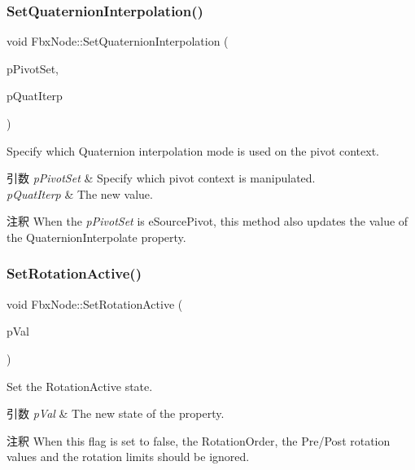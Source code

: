 \subsubsection{\texorpdfstring{Set\+Quaternion\+Interpolation()}{SetQuaternionInterpolation()}}
{\footnotesize\ttfamily void Fbx\+Node\+::\+Set\+Quaternion\+Interpolation (\begin{DoxyParamCaption}\item[{\hyperlink{class_fbx_node_ae62b7311ac4727654cdf1ebd5cbf7343}{E\+Pivot\+Set}}]{p\+Pivot\+Set,  }\item[{\hyperlink{fbxmath_8h_a9c7a0dfb52c83256d4a92c5c6d1be72a}{E\+Fbx\+Quat\+Interp\+Mode}}]{p\+Quat\+Iterp }\end{DoxyParamCaption})}

Specify which Quaternion interpolation mode is used on the pivot context. 
\begin{DoxyParams}{引数}
{\em p\+Pivot\+Set} & Specify which pivot context is manipulated. \\
\hline
{\em p\+Quat\+Iterp} & The new value. \\
\hline
\end{DoxyParams}
\begin{DoxyRemark}{注釈}
When the {\itshape p\+Pivot\+Set} is e\+Source\+Pivot, this method also updates the value of the Quaternion\+Interpolate property. 
\end{DoxyRemark}
\mbox{\label{class_fbx_node_aee328b4f0ff64c2e80dc7a0840c51f80}} 
\subsubsection{\texorpdfstring{Set\+Rotation\+Active()}{SetRotationActive()}}
{\footnotesize\ttfamily void Fbx\+Node\+::\+Set\+Rotation\+Active (\begin{DoxyParamCaption}\item[{bool}]{p\+Val }\end{DoxyParamCaption})}

Set the Rotation\+Active state. 
\begin{DoxyParams}{引数}
{\em p\+Val} & The new state of the property. \\
\hline
\end{DoxyParams}
\begin{DoxyRemark}{注釈}
When this flag is set to false, the Rotation\+Order, the Pre/\+Post rotation values and the rotation limits should be ignored. 
\end{DoxyRemark}
\mbox{\label{class_fbx_node_a6909d137f4d0432b5885cbea670f28f3}} 
